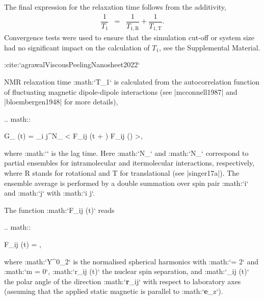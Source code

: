 The final expression for the relaxation time follows from the additivity,
\begin{eqnarray}
\dfrac{1}{T_{1}} & = & \dfrac{1}{T_{1, \text{R}}}+\dfrac{1}{T_{1, \text{T}}}.
\end{eqnarray}
Convergence tests were used to ensure that the simulation cut-off or system size
had no significant impact on the calculation of $T_1$, see the Supplemental
Material. 







































:cite:`agrawalViscousPeelingNanosheet2022` 

NMR relaxation time :math:`T_1` is calculated from 
the autocorrelation function of fluctuating magnetic 
dipole-dipole interactions (see |mcconnell1987| and |bloembergen1948| for more details),

.. math::

    G_ (t) =  \sum_{i \ne j}^{N_} 
    \left< {\cal F}_{ij} (t + \tau) {\cal F}_{ij} (\tau)  \right>,

where :math:`\tau` is the lag time. Here :math:`N_` and :math:`N_`
correspond to partial ensembles for intramolecular and itermolecular interactions,
respectively, where R stands for rotational and T for translational (see |singer17a|). The ensemble average is performed by a 
double summation over spin pair :math:`i` and :math:`j` with :math:`i \ne j`.

The function :math:`{\cal F}_{ij} (t)` reads

.. math::
    
    {\cal F}_{ij} (t) =  ,

where :math:`Y^0_2` is the normalised spherical harmonics with :math:`\ell = 2` and :math:`m = 0`,
:math:`r_{ij} (t)` the nuclear spin separation, and :math:`\theta_{ij} (t)` the polar angle
of the direction :math:`\textbf{r}_{ij}` with respect to laboratory axes (assuming that 
the applied static magnetic is parallel to :math:`\textbf{e}_z`).

